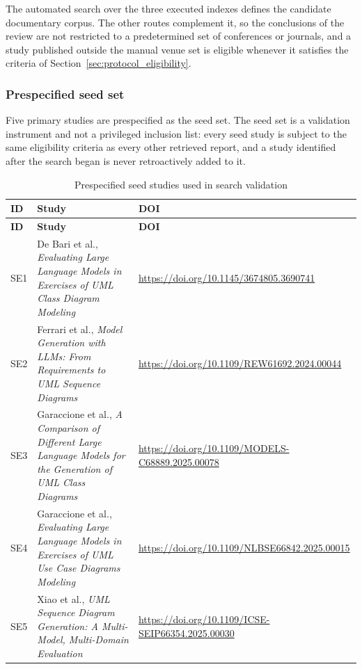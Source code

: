 The automated search over the three executed indexes defines the candidate documentary corpus. The other routes complement it, so the conclusions of the review are not restricted to a predetermined set of conferences or journals, and a study published outside the manual venue set is eligible whenever it satisfies the criteria of Section~\ref{sec:protocol_eligibility}.

\subsubsection{Prespecified seed set}

Five primary studies are prespecified as the seed set. The seed set is a validation instrument and not a privileged inclusion list: every seed study is subject to the same eligibility criteria as every other retrieved report, and a study identified after the search began is never retroactively added to it.

\begin{longtable}{p{} p{} p{}}
\caption{Prespecified seed studies used in search validation}
\label{tab:protocol_seed_set}\\
\toprule
\textbf{ID} & \textbf{Study} & \textbf{DOI} \\
\midrule
\endfirsthead
\toprule
\textbf{ID} & \textbf{Study} & \textbf{DOI} \\
\midrule
\endhead
SE1 & De Bari et al., \emph{Evaluating Large Language Models in Exercises of UML Class Diagram Modeling} \cite{DeBari2024UML} & \url{https://doi.org/10.1145/3674805.3690741} \\
SE2 & Ferrari et al., \emph{Model Generation with LLMs: From Requirements to UML Sequence Diagrams} \cite{Ferrari2024Sequence} & \url{https://doi.org/10.1109/REW61692.2024.00044} \\
SE3 & Garaccione et al., \emph{A Comparison of Different Large Language Models for the Generation of UML Class Diagrams} \cite{Garaccione2025Class} & \url{https://doi.org/10.1109/MODELS-C68889.2025.00078} \\
SE4 & Garaccione et al., \emph{Evaluating Large Language Models in Exercises of UML Use Case Diagrams Modeling} \cite{Garaccione2025UseCase} & \url{https://doi.org/10.1109/NLBSE66842.2025.00015} \\
SE5 & Xiao et al., \emph{UML Sequence Diagram Generation: A Multi-Model, Multi-Domain Evaluation} \cite{Xiao2025Sequence} & \url{https://doi.org/10.1109/ICSE-SEIP66354.2025.00030} \\
\bottomrule
\end{longtable}

